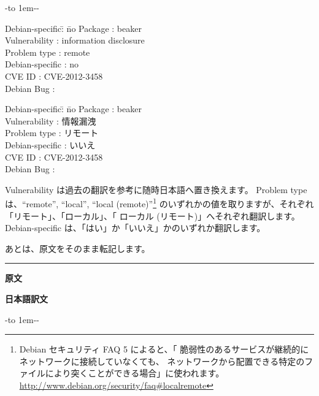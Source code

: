 \documentclass[mingoth,a4paper]{jsarticle}
\begin{document}
-\leaders\hbox to 1em{\hss{}-\hss}\hfill -\par
\parbox[t]{0.48\linewidth}{
\begin{tabbing}
Debian-specific\= : \= no\kill
Package        \> : \>  beaker \\
Vulnerability  \> : \>  information disclosure\\
Problem type   \> : \>  remote\\
Debian-specific\> : \>  no\\
CVE ID         \> : \> CVE-2012-3458 \\
Debian Bug     \> : \\
\end{tabbing}
}\hfil \vrule \hfil
\parbox[t]{0.48\linewidth}{
\begin{tabbing}
Debian-specific\= : \= no\kill
Package        \> : \>  beaker \\
Vulnerability  \> : \>  情報漏洩\\
Problem type   \> : \>  リモート\\
Debian-specific\> : \>  いいえ\\
CVE ID         \> : \> CVE-2012-3458\\
Debian Bug     \> : \\
\end{tabbing}
}\hfill


Vulnerability は過去の翻訳を参考に随時日本語へ置き換えます。
Problem type は、``remote'', ``local'', ``local (remote)''\footnote{Debian セキュリティ FAQ 5 によると、「 脆弱性のあるサービスが継続的にネットワークに接続していなくても、 ネットワークから配置できる特定のファイルにより突くことができる場合」に使われます。\url{http://www.debian.org/security/faq\#localremote}} のいずれかの値を取りますが、それぞれ「リモート」、「ローカル」、「 ローカル (リモート)」へそれぞれ翻訳します。
Debian-specific は、「はい」か「いいえ」かのいずれか翻訳します。

あとは、原文をそのまま転記します。


\vspace{1ex}
\pagebreak[2]

\hrule
{}\par
\parbox[t]{0.48\linewidth}{{\bf 原文}}\hfil \parbox{0.48\linewidth}{\bf 日本語訳文}\par\vspace{0.1em}

-\leaders\hbox to 1em{\hss{}-\hss}\hfill -\par
\end{document}
